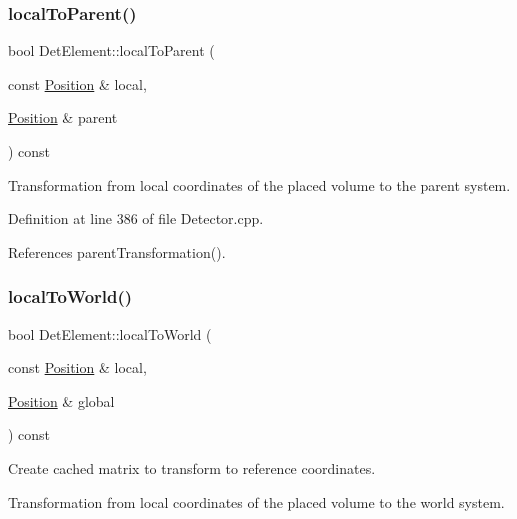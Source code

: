 \subsubsection{\texorpdfstring{local\+To\+Parent()}{localToParent()}}
{\footnotesize\ttfamily bool Det\+Element\+::local\+To\+Parent (\begin{DoxyParamCaption}\item[{const \hyperlink{namespace_d_d4hep_1_1_geometry_a55083902099d03506c6db01b80404900}{Position} \&}]{local,  }\item[{\hyperlink{namespace_d_d4hep_1_1_geometry_a55083902099d03506c6db01b80404900}{Position} \&}]{parent }\end{DoxyParamCaption}) const}



Transformation from local coordinates of the placed volume to the parent system. 



Definition at line 386 of file Detector.\+cpp.



References parent\+Transformation().

\hypertarget{class_d_d4hep_1_1_geometry_1_1_det_element_a89378b5ed5ac76d41ac4013d21e82387}{}\label{class_d_d4hep_1_1_geometry_1_1_det_element_a89378b5ed5ac76d41ac4013d21e82387} 
\subsubsection{\texorpdfstring{local\+To\+World()}{localToWorld()}}
{\footnotesize\ttfamily bool Det\+Element\+::local\+To\+World (\begin{DoxyParamCaption}\item[{const \hyperlink{namespace_d_d4hep_1_1_geometry_a55083902099d03506c6db01b80404900}{Position} \&}]{local,  }\item[{\hyperlink{namespace_d_d4hep_1_1_geometry_a55083902099d03506c6db01b80404900}{Position} \&}]{global }\end{DoxyParamCaption}) const}



Create cached matrix to transform to reference coordinates. 

Transformation from local coordinates of the placed volume to the world system.

